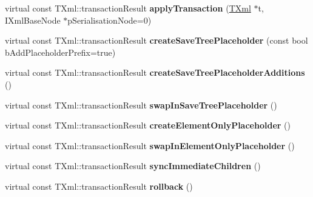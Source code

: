 \begin{DoxyCompactItemize}
\item 
\hypertarget{classgeneral__server_1_1Repository_a493dcc5b279c7871c2b58215defdce74}{virtual const \*
\-T\-Xml\-::transaction\-Result {\bfseries apply\-Transaction} (\hyperlink{classgeneral__server_1_1TXml}{\-T\-Xml} $\ast$t, \-I\-Xml\-Base\-Node $\ast$p\-Serialisation\-Node=0)}\label{classgeneral__server_1_1Repository_a493dcc5b279c7871c2b58215defdce74}

\item 
\hypertarget{classgeneral__server_1_1Repository_adfb95a2bf00735b90f24908b3f7f6f59}{virtual const \*
\-T\-Xml\-::transaction\-Result {\bfseries create\-Save\-Tree\-Placeholder} (const bool b\-Add\-Placeholder\-Prefix=true)}\label{classgeneral__server_1_1Repository_adfb95a2bf00735b90f24908b3f7f6f59}

\item 
\hypertarget{classgeneral__server_1_1Repository_aa8f66c26b72e24a221c69e0849979307}{virtual const \*
\-T\-Xml\-::transaction\-Result {\bfseries create\-Save\-Tree\-Placeholder\-Additions} ()}\label{classgeneral__server_1_1Repository_aa8f66c26b72e24a221c69e0849979307}

\item 
\hypertarget{classgeneral__server_1_1Repository_a598c5d669c8f2becc800d2c5e1b4dda5}{virtual const \*
\-T\-Xml\-::transaction\-Result {\bfseries swap\-In\-Save\-Tree\-Placeholder} ()}\label{classgeneral__server_1_1Repository_a598c5d669c8f2becc800d2c5e1b4dda5}

\item 
\hypertarget{classgeneral__server_1_1Repository_a27e1a3302fbb90ee024e6ad6ce4d3caf}{virtual const \*
\-T\-Xml\-::transaction\-Result {\bfseries create\-Element\-Only\-Placeholder} ()}\label{classgeneral__server_1_1Repository_a27e1a3302fbb90ee024e6ad6ce4d3caf}

\item 
\hypertarget{classgeneral__server_1_1Repository_a53252af0f0be9388ffd2f2ceddac62cc}{virtual const \*
\-T\-Xml\-::transaction\-Result {\bfseries swap\-In\-Element\-Only\-Placeholder} ()}\label{classgeneral__server_1_1Repository_a53252af0f0be9388ffd2f2ceddac62cc}

\item 
\hypertarget{classgeneral__server_1_1Repository_a791a8e3530d805c98aea6eb528b2fec5}{virtual const \*
\-T\-Xml\-::transaction\-Result {\bfseries sync\-Immediate\-Children} ()}\label{classgeneral__server_1_1Repository_a791a8e3530d805c98aea6eb528b2fec5}

\item 
\hypertarget{classgeneral__server_1_1Repository_ab5121f0d04302652c56693d9fabfb969}{virtual const \*
\-T\-Xml\-::transaction\-Result {\bfseries rollback} ()}\label{classgeneral__server_1_1Repository_ab5121f0d04302652c56693d9fabfb969}

\end{DoxyCompactItemize}
